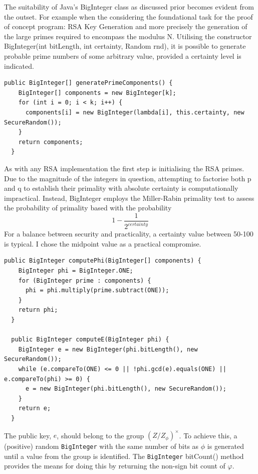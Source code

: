 \documentclass[]{final_report}
\theoremstyle{definition}
\begin{document}
The suitability of Java's BigInteger class as discussed prior becomes evident from the outset. For example when the considering the foundational task for the proof of concept program: RSA Key Generation and more precisely the generation of the large primes required to encompass the modulus N.
Utilising the constructor BigInteger(int bitLength, int certainty, Random rnd), it is possible to generate probable prime numbers of some arbitrary value, provided a certainty level is indicated.
\begin{lstlisting}[caption=Parametrisable Prime Generation with BigInteger]
public BigInteger[] generatePrimeComponents() {
    BigInteger[] components = new BigInteger[k];
    for (int i = 0; i < k; i++) {
      components[i] = new BigInteger(lambda[i], this.certainty, new SecureRandom());
    }
    return components;
  }
\end{lstlisting}
As with any RSA implementation the first step is initialising the RSA primes. 
Due to the magnitude of the integers in question, attempting to factorise both p and q to establish their primality with absolute certainty is computationally impractical. Instead, BigInteger employs the Miller-Rabin primality test to assess the probability of primality based with the probability  \[ 1 - \frac{1}{2^{certainty}}\]
For a balance between security and practicality, a certainty value between 50-100 is typical. I chose the midpoint value as a practical compromise.

\begin{lstlisting}[caption=Key components]
  public BigInteger computePhi(BigInteger[] components) {
    BigInteger phi = BigInteger.ONE;
    for (BigInteger prime : components) {
      phi = phi.multiply(prime.subtract(ONE));
    }
    return phi;
  }
  
  public BigInteger computeE(BigInteger phi) {
    BigInteger e = new BigInteger(phi.bitLength(), new SecureRandom());
    while (e.compareTo(ONE) <= 0 || !phi.gcd(e).equals(ONE) || e.compareTo(phi) >= 0) {
      e = new BigInteger(phi.bitLength(), new SecureRandom());
    }
    return e;
  }
\end{lstlisting}
The public key, \( e \), should belong to the group \( (Z/ Z_{\phi})^{\times} \). To achieve this, a (positive) random \texttt{BigInteger} with the same number of bits as \( \phi \) is generated until a value from the group is identified. The \texttt{BigInteger} bitCount() method provides the means for doing this by returning the non-sign bit count of $\varphi$. 
\end{document}
